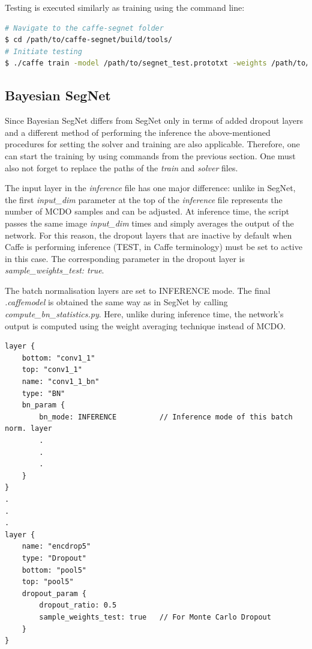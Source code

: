 Testing is executed similarly as training using the command line:

\begin{lstlisting}[language=bash]
# Navigate to the caffe-segnet folder
$ cd /path/to/caffe-segnet/build/tools/
# Initiate testing
$ ./caffe train -model /path/to/segnet_test.prototxt -weights /path/to/final_weights.caffemodel
\end{lstlisting}

\newpage
\subsection{Bayesian SegNet}

Since Bayesian SegNet differs from SegNet only in terms of added dropout layers and a different method of performing the inference the above-mentioned procedures for setting the solver and training are also applicable. Therefore, one can start the training by using commands from the previous section. One must also not forget to replace the paths of the \textit{train} and \textit{solver} files. 

The input layer in the \textit{inference} file has one major difference: unlike in SegNet, the first \textit{input\_dim} parameter at the top of the \textit{inference} file represents the number of MCDO samples and can be adjusted. At inference time, the script passes the same image \textit{input\_dim} times and simply averages the output of the network. For this reason, the dropout layers that are inactive by default when Caffe is performing inference (TEST, in Caffe terminology) must be set to active in this case. The corresponding parameter in the dropout layer is \textit{sample\_weights\_test: true}. 

The batch normalisation layers are set to INFERENCE mode. The final \textit{.caffemodel} is obtained the same way as in SegNet by calling \textit{compute\_bn\_statistics.py}. Here, unlike during inference time, the network's output is computed using the weight averaging technique instead of MCDO.

\begin{lstlisting}[caption={Setting MCDO in \textit{inference.prototxt} \cite{filip_github}},captionpos=b]
layer {
	bottom: "conv1_1"
	top: "conv1_1"
	name: "conv1_1_bn"
	type: "BN"
	bn_param {
		bn_mode: INFERENCE			// Inference mode of this batch norm. layer
		.
		.
		.
	}
}
.
.
.
layer {
	name: "encdrop5"
	type: "Dropout"
	bottom: "pool5"
	top: "pool5"
	dropout_param {
		dropout_ratio: 0.5
		sample_weights_test: true	// For Monte Carlo Dropout
	}
}
\end{lstlisting}

